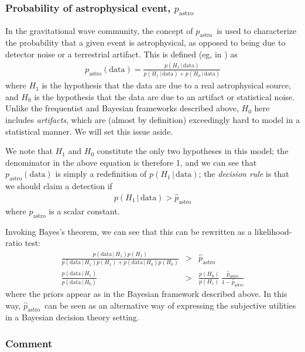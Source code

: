 \documentclass[11pt,letterpaper,linenumbers]{aastex7}
\newcommand{\fg}{\ensuremath{H_1}}
\newcommand{\bg}{\ensuremath{H_0}}
\newcommand{\data}{\ensuremath{\textrm{data}}}
\newcommand{\given}{\,\vert\,}
\newcommand{\pastro}{\ensuremath{p_\textrm{astro}}}
\newcommand{\hatpastro}{\ensuremath{\hat{p}_\textrm{astro}}}
\newcommand{\changed}[1]{#1}
\begin{document}
\changed{
\subsubsection{Probability of astrophysical event, \pastro}
In the gravitational wave community, the concept of \pastro\ is used
to characterize the probability that a given event is astrophysical, as opposed to being
due to detector noise or a terrestrial artifact.  This is defined (eg, in \citealt{unified_pastro}) as
\begin{eqnarray}
  \pastro(\data) = \frac{p(H_1 \given \data)}{p(H_1 \given \data) + p(H_0 \given \data)}
\end{eqnarray}
where $H_1$ is the hypothesis that the data are due to a real
astrophysical source, and $H_0$ is the hypothesis that the data are
due to an artifact or statistical noise.  Unlike the frequentist and
Bayesian frameworks described above, $H_0$ here includes
\emph{artifacts}, which are (almost by definition) exceedingly hard to
model in a statistical manner.  We will set this issue aside.
}
\changed{
We note that $H_1$ and $H_0$ constitute the only two hypotheses in
this model; the denominator in the above equation is therefore 1, and
we can see that $\pastro(\data)$ is simply a redefinition of $p(H_1
\given \data)$; the \emph{decision rule} is that we should claim a detection if
\begin{eqnarray}
  p(H_1 \given \data) > \hatpastro
\end{eqnarray}
where $\hatpastro$ is a scalar constant.
}
\changed{
Invoking Bayes's theorem, we can see that this can be rewritten as a likelihood-ratio test:
\begin{eqnarray}
  \frac{p(\data \given \fg) p(\fg)}%
       {p(\data \given \fg) p(\fg) + p(\data \given \bg) p(\bg)} &>& \hatpastro \\
       \frac{p(\data \given \fg)}{p(\data \given \bg)} &>& \frac{p(\bg)}{p(\fg)} \, \frac{\hatpastro}{1 - \hatpastro}
\end{eqnarray}
where the priors appear as in the Bayesian framework described above.
In this way, \hatpastro\ can be seen as an alternative way of expressing the subjective utilities in
a Bayesian decision theory setting.
}

\subsubsection{Comment}

\end{document}
